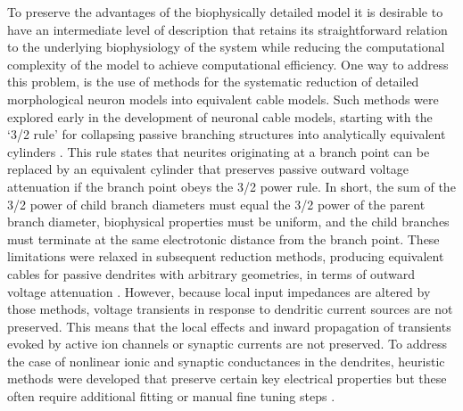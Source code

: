 To preserve the advantages of the biophysically detailed model it is
desirable to have an intermediate level of description that retains
its straightforward relation to the underlying biophysiology of the system
while reducing the computational complexity of the model to achieve computational
efficiency. One way to address this problem, is the use of methods for
the systematic reduction of detailed morphological neuron models into
equivalent cable models. Such methods were explored
early in the development of neuronal cable models, starting with the
`3/2 rule' for collapsing passive branching structures into
analytically equivalent cylinders \cite{rall_branching_1959,rall1964theoretical}.
This rule states that neurites originating at a branch point can be replaced
by an equivalent cylinder that preserves passive outward voltage attenuation
if the branch point obeys the 3/2 power rule. In short, the sum of the 3/2 power
of child branch diameters must equal the 3/2 power of the parent branch diameter,
biophysical properties must be uniform, and the child branches must terminate
at the same electrotonic distance from the branch point.
These limitations were relaxed in subsequent reduction methods, producing
equivalent cables for passive dendrites with arbitrary geometries, in terms
of outward voltage attenuation  \cite{clements1989cable,stratford1989modelling,douglas1992exploring,ohme1998equivalent,fleshman1988electrotonic,evans2000analysis}.
%
However, because local input impedances are altered by those methods,
voltage transients in response to dendritic current sources are not
preserved. This means that the local effects and inward propagation of
transients evoked by active ion channels or synaptic currents are not preserved.
To address the case of nonlinear ionic and synaptic conductances in the dendrites,
heuristic methods were developed that preserve certain key electrical properties
but these often require additional fitting or manual fine tuning steps
\cite{traub_model_1991,bush_reduced_1993,pinsky_intrinsic_1994,davison_reduced_2000,marasco_fast_2012}.

